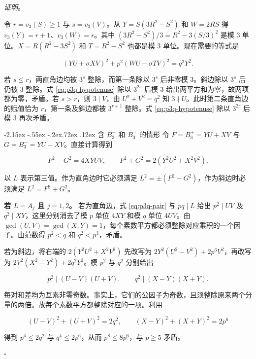 \documentclass[11pt,a4paper,twoside]{article}
\makeatletter
\numberwithin{equation}{section}
\newcommand{\proseheadingstop}{。}
\providecommand{\proofname}{证明}
\renewcommand{\subsection}{\@startsection{subsection}{2}{\z@}%
  {-2.15ex \@plus -.55ex \@minus -.2ex}{.72ex \@plus .12ex}%
  {\normalfont\normalsize\bfseries}}
\newenvironment{proof}[1][\proofname]{%
  \par\addvspace{.65\baselineskip}\noindent
  \textit{#1}\proseheadingstop\enspace\ignorespaces
}{%
  \unskip\nobreak\hfill\nobreak\(\square\)\par
  \addvspace{.65\baselineskip}
}
\makeatother
\begin{document}
\begin{proof}
令 \(r=v_3(S)\ge1\) 与 \(s=v_3(V)\)。从 \(Y=S(3R^2-S^2)\) 和 \(W=2RS\) 得 \(v_3(Y)=r+1\)、\(v_3(W)=r\)。其中 \((3R^2-S^2)/3=R^2-3(S/3)^2\) 是模 \(3\) 单位。\(X=R(R^2-3S^2)\) 和 \(T=R^2-S^2\) 也都是模 \(3\) 单位。现在需要的等式是

\begin{equation}\label{eq:p3q-hypotenuse}
(YU+\sigma XV)^2+p^2(WU-\sigma TV)^2=q^2Y^2.
\end{equation}

若 \(s\le r\)，两直角边均被 \(3^s\) 整除，而第一条除以 \(3^s\) 后非零模 \(3\)。斜边除以 \(3^s\) 后仍被 \(3\) 整除。式 \eqref{eq:p3q-hypotenuse} 除以 \(3^{2s}\) 后模 \(3\) 给出两平方和为零，故两项都为零，矛盾。若 \(s>r\)，则 \(3\mid V\)，由 \(U^2+V^2=q^2\) 知 \(3\nmid U\)。此时第二条直角边的赋值恰为 \(r\)，第一条及斜边都被 \(3^{r+1}\) 整除。式 \eqref{eq:p3q-hypotenuse} 除以 \(3^{2r}\) 后模 \(3\) 再次矛盾。

\subsection{含 \texorpdfstring{\(B_3^+\)}{B₃⁺} 和 \texorpdfstring{\(B_3^-\)}{B₃⁻} 的情形}
令 \(F=B_3^+=YU+XV\) 与 \(G=B_3^-=YU-XV\)。直接计算得到

\begin{equation}\label{eq:p3q-pair}
F^2-G^2=4XYUV,\qquad F^2+G^2=2(Y^2U^2+X^2V^2).
\end{equation}

以 \(L\) 表示第三值。作为直角边时它必须满足 \(L^2=\pm(F^2-G^2)\)，作为斜边时必须满足 \(L^2=F^2+G^2\)。

\textbf{若 \(L=A_j\) 且 \(j=1,2\)。} 若为直角边，式 \eqref{eq:p3q-pair} 与 \(pq\mid L\) 给出 \(p^2\mid UV\) 及 \(q^2\mid XY\)，这里分别消去了模 \(p\) 单位 \(4XY\) 和模 \(q\) 单位 \(4UV\)。由 \(\gcd(U,V)=\gcd(X,Y)=1\)，每个素数平方都必须整除对应乘积的一个因子。由范数得 \(p^2<q\) 和 \(q^2<p^3\)，矛盾。

若为斜边，将右端的 \(2(Y^2U^2+X^2V^2)\) 先改写为 \(2Y^2(U^2-V^2)+2p^6V^2\)，再改写为 \(2V^2(X^2-Y^2)+2q^2Y^2\)。模 \(p^2\) 与 \(q^2\) 分别给出

\[
p^2\mid(U-V)(U+V),\qquad q^2\mid(X-Y)(X+Y).
\]

每对和差均为互素非零奇数。事实上，它们的公因子为奇数，且须整除原来两个分量的两倍。故每个素数平方都整除对应的一项。利用

\[
(U-V)^2+(U+V)^2=2q^2,\qquad
(X-Y)^2+(X+Y)^2=2p^6
\]

得到 \(p^4\le2q^2\) 与 \(q^4\le2p^6\)，从而 \(p^8\le8p^6\)，与 \(p\ge5\) 矛盾。


\end{proof}
\end{document}
